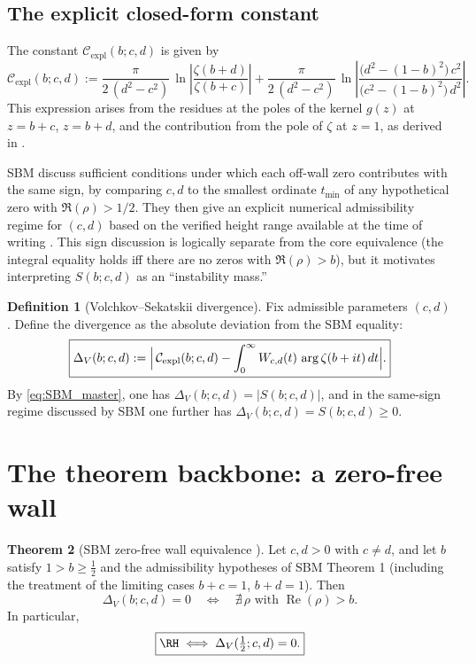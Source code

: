 \documentclass[11pt]{article}
\theoremstyle{definition}
\newtheorem{definition}{Definition}[section]
\newtheorem{theorem}[definition]{Theorem}
\newcommand{\ReB}{\operatorname{Re}}
\newcommand{\argB}{\operatorname{arg}}
\newcommand{\boxeq}{\boxed}
\begin{document}
\subsection{The explicit closed-form constant}
The constant $\mathcal{C}_{\mathrm{expl}}(b;c,d)$ is given by
\begin{equation}\label{eq:C_expl}
\boxeq{
\mathcal{C}_{\mathrm{expl}}(b;c,d)
:=
\frac{\pi}{2\,(d^2-c^2)}\,
\ln\!\left| \frac{\zeta(b+d)}{\zeta(b+c)} \right|
+
\frac{\pi}{2\,(d^2-c^2)}\,
\ln\!\left| \frac{\bigl(d^2-(1-b)^2\bigr)\,c^2}
                 {\bigl(c^2-(1-b)^2\bigr)\,d^2} \right|.
}
\end{equation}
This expression arises from the residues at the poles of the kernel $g(z)$ at $z=b+c$, $z=b+d$, and the contribution from the pole of $\zeta$ at $z=1$, as derived in \cite{SBM2009}.

\begin{remark}
SBM discuss sufficient conditions under which each off-wall zero contributes with the same sign, by comparing $c,d$ to the smallest ordinate $t_{\min}$ of any hypothetical zero with $\Re(\rho)>1/2$. They then give an explicit numerical admissibility regime for $(c,d)$ based on the verified height range available at the time of writing \cite{SBM2009}. This sign discussion is logically separate from the core equivalence (the integral equality holds iff there are no zeros with $\Re(\rho)>b$), but it motivates interpreting $S(b;c,d)$ as an ``instability mass.''
\end{remark}

\begin{definition}[Volchkov--Sekatskii divergence]
Fix admissible parameters $(c,d)$. Define the divergence as the absolute deviation from the SBM equality:
\[
\boxeq{
\Delta_V(b;c,d)
:=
\Bigl|\,
\mathcal{C}_{\mathrm{expl}}(b;c,d)
-
\int_{0}^{\infty}W_{c,d}(t)\,\argB\zeta(b+it)\,dt
\Bigr|.
}
\]
By \eqref{eq:SBM_master}, one has $\Delta_V(b;c,d)=|S(b;c,d)|$, and in the same-sign regime discussed by SBM one further has $\Delta_V(b;c,d)=S(b;c,d)\ge0$.
\end{definition}

\section{The theorem backbone: a zero-free wall}

\begin{theorem}[SBM zero-free wall equivalence \cite{SBM2009}]\label{thm:SBMwall}
Let $c,d>0$ with $c\neq d$, and let $b$ satisfy $1>b\ge\tfrac12$ and the admissibility hypotheses of SBM Theorem 1 (including the treatment of the limiting cases $b+c=1$, $b+d=1$). Then
\[
\boxeq{\Delta_V(b;c,d)=0\quad\iff\quad \nexists\,\rho\text{ with }\ReB(\rho)>b.}
\]
In particular,
\[
\boxeq{\RH\iff \Delta_V(\tfrac12;c,d)=0.}
\]
\end{theorem}
\end{document}
